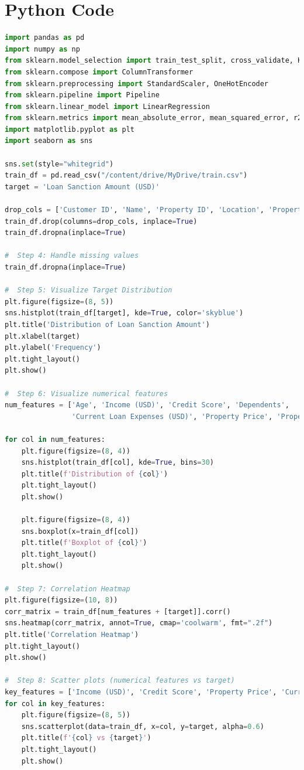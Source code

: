 \documentclass[12pt]{article}
\begin{document}
\section*{Python Code}
\begin{lstlisting}[language=Python]
import pandas as pd
import numpy as np
from sklearn.model_selection import train_test_split, cross_validate, KFold
from sklearn.compose import ColumnTransformer
from sklearn.preprocessing import StandardScaler, OneHotEncoder
from sklearn.pipeline import Pipeline
from sklearn.linear_model import LinearRegression
from sklearn.metrics import mean_absolute_error, mean_squared_error, r2_score
import matplotlib.pyplot as plt
import seaborn as sns

sns.set(style="whitegrid")
train_df = pd.read_csv("/content/drive/MyDrive/train.csv")
target = 'Loan Sanction Amount (USD)'

drop_cols = ['Customer ID', 'Name', 'Property ID', 'Location', 'Property Location']
train_df.drop(columns=drop_cols, inplace=True)
train_df.dropna(inplace=True)

#  Step 4: Handle missing values
train_df.dropna(inplace=True)

#  Step 5: Visualize Target Distribution
plt.figure(figsize=(8, 5))
sns.histplot(train_df[target], kde=True, color='skyblue')
plt.title('Distribution of Loan Sanction Amount')
plt.xlabel(target)
plt.ylabel('Frequency')
plt.tight_layout()
plt.show()

#  Step 6: Visualize numerical features
num_features = ['Age', 'Income (USD)', 'Credit Score', 'Dependents',
                'Current Loan Expenses (USD)', 'Property Price', 'Property Age']

for col in num_features:
    plt.figure(figsize=(8, 4))
    sns.histplot(train_df[col], kde=True, bins=30)
    plt.title(f'Distribution of {col}')
    plt.tight_layout()
    plt.show()

    plt.figure(figsize=(8, 4))
    sns.boxplot(x=train_df[col])
    plt.title(f'Boxplot of {col}')
    plt.tight_layout()
    plt.show()

#  Step 7: Correlation Heatmap
plt.figure(figsize=(10, 8))
corr_matrix = train_df[num_features + [target]].corr()
sns.heatmap(corr_matrix, annot=True, cmap='coolwarm', fmt=".2f")
plt.title('Correlation Heatmap')
plt.tight_layout()
plt.show()

#  Step 8: Scatter plots (numerical features vs target)
key_features = ['Income (USD)', 'Credit Score', 'Property Price', 'Current Loan Expenses (USD)']
for col in key_features:
    plt.figure(figsize=(8, 5))
    sns.scatterplot(data=train_df, x=col, y=target, alpha=0.6)
    plt.title(f'{col} vs {target}')
    plt.tight_layout()
    plt.show()


\end{lstlisting}
\end{document}
